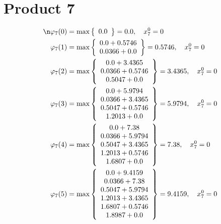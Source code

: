 \documentclass{article}
\begin{document}
\section{Product 7}
\begin{align*}
\n  
  
\varphi_{7}(0) &= \max \left\{ \begin{array}{c}
0.0
\end{array} \right\}=0.0,\quad x_{7}^0=0\\
  
  
  
  
\varphi_{7}(1) &= \max \left\{ \begin{array}{c}
0.0 + 0.5746 \\
 0.0366 + 0.0
\end{array} \right\}=0.5746,\quad x_{7}^0=0\\
  
  
  
  
\varphi_{7}(2) &= \max \left\{ \begin{array}{c}
0.0 + 3.4365 \\
 0.0366 + 0.5746 \\
 0.5047 + 0.0
\end{array} \right\}=3.4365,\quad x_{7}^0=0\\
  
  
  
  
\varphi_{7}(3) &= \max \left\{ \begin{array}{c}
0.0 + 5.9794 \\
 0.0366 + 3.4365 \\
 0.5047 + 0.5746 \\
 1.2013 + 0.0
\end{array} \right\}=5.9794,\quad x_{7}^0=0\\
  
  
  
  
\varphi_{7}(4) &= \max \left\{ \begin{array}{c}
0.0 + 7.38 \\
 0.0366 + 5.9794 \\
 0.5047 + 3.4365 \\
 1.2013 + 0.5746 \\
 1.6807 + 0.0
\end{array} \right\}=7.38,\quad x_{7}^0=0\\
  
  
  
  
\varphi_{7}(5) &= \max \left\{ \begin{array}{c}
0.0 + 9.4159 \\
 0.0366 + 7.38 \\
 0.5047 + 5.9794 \\
 1.2013 + 3.4365 \\
 1.6807 + 0.5746 \\
 1.8987 + 0.0
\end{array} \right\}=9.4159,\quad x_{7}^0=0\\
  

\end{align*}
\end{document}
